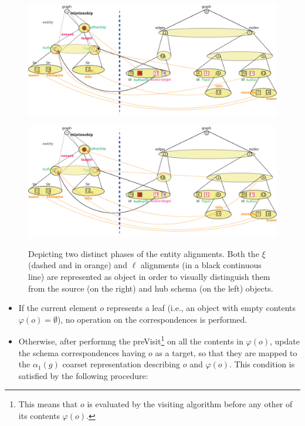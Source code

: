 \begin{example}[continues=ex:examplegraphdata,label=ex:examplereferencedOcaml]
\begin{figure}[!t]
	\centering
	\begin{minipage}{\textwidth}
		\centering
		\includegraphics[width=\textwidth]{fig/04model/04aAlignment}
		\label{subfig:match1}
	\end{minipage}
	\medskip
	
	\begin{minipage}{\textwidth}
		\centering
		\includegraphics[width=\textwidth]{fig/04model/04bAlignment}
		\label{subfig:match2}
	\end{minipage}
	\caption{Depicting two distinct phases of the entity alignments. Both the $\xi$  (dashed and in orange) and  $\ell$ alignments (in a black continuous line) are represented as object in order to visually distinguish them from the source (on the right) and hub  schema (on the left) objects.}
	\label{fig:alignmentrefinement}
\end{figure}
\begin{itemize}
	\item If the current element $o$ represents a leaf (i.e., an object with empty contents $\varphi(o)=\emptyset$), no operation on the correspondences is performed.
	\item Otherwise, after performng the preVisit\footnote{This means that $o$ is evaluated by the visiting algorithm before any other of its contents $\varphi(o)$.} on all the contents in $\varphi(o)$, update the schema correspondences having $o$ as  a target, so that they are mapped to the $\alpha_1(g)$ coarset representation describing $o$ and $\varphi(o)$. This condition is satisfied by the following procedure:
	\medskip
	

\end{itemize}
\end{example}
